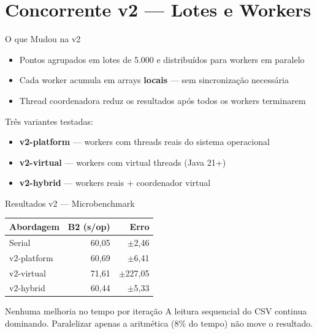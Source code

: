 \section{Concorrente v2 --- Lotes e Workers}

\begin{frame}{O que Mudou na v2}
    \begin{itemize}
        \item Pontos agrupados em lotes de 5.000 e distribuídos para workers em paralelo
        \item Cada worker acumula em arrays \textbf{locais} --- sem sincronização necessária
        \item Thread coordenadora reduz os resultados após todos os workers terminarem
    \end{itemize}

    \vspace{0.5em}
    Três variantes testadas:
    \begin{itemize}
        \item \textbf{v2-platform} --- workers com threads reais do sistema operacional
        \item \textbf{v2-virtual} --- workers com virtual threads (Java 21+)
        \item \textbf{v2-hybrid} --- workers reais + coordenador virtual
    \end{itemize}
\end{frame}

\begin{frame}{Resultados v2 --- Microbenchmark}
    \begin{center}
    \begin{tabular}{lrr}
        \toprule
        \textbf{Abordagem} & \textbf{B2 (s/op)} & \textbf{Erro} \\
        \midrule
        Serial       & 60,05 & $\pm$2,46 \\
        v2-platform  & 60,69 & $\pm$6,41 \\
        v2-virtual   & 71,61 & \alert{$\pm$227,05} \\
        v2-hybrid    & 60,44 & $\pm$5,33 \\
        \bottomrule
    \end{tabular}
    \end{center}

    \vspace{0.5em}
    \begin{alertblock}{Nenhuma melhoria no tempo por iteração}
        A leitura sequencial do CSV continua dominando. Paralelizar apenas a aritmética
        (8\% do tempo) não move o resultado.
    \end{alertblock}
\end{frame}

